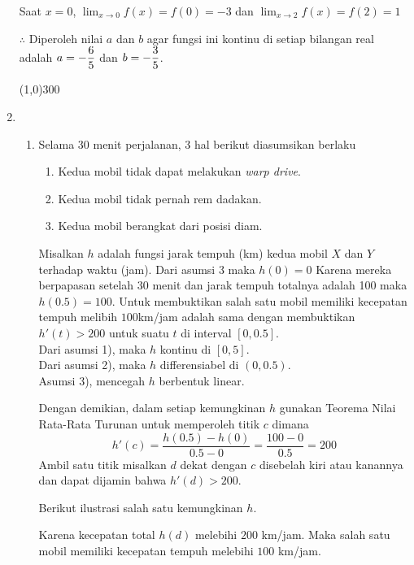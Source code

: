 \begin{enumerate}[leftmargin=*, label={\arabic*}.]
Saat $x=0$, $\lim_{x\to 0} f(x) = f(0)=-3$ dan $\lim_{x\to 2} f(x) = f(2)=1$

$\therefore$ Diperoleh nilai $a$ dan $b$ agar fungsi ini kontinu di setiap 
bilangan real adalah $\displaystyle a = -\frac{6}{5}$ dan $\displaystyle b=-\frac{3}{5}$.


\begin{center}\line(1,0){300}\end{center}


\item 
    \begin{enumerate}[label={\alph*}.]
    \item Selama 30 menit perjalanan, 3 hal berikut diasumsikan berlaku 
        \begin{enumerate}[label={\arabic*})]
        \item Kedua mobil tidak dapat melakukan \textit{warp drive}.
        \item Kedua mobil tidak pernah rem dadakan.
        \item Kedua mobil berangkat dari posisi diam.
        \end{enumerate}
    Misalkan $h$ adalah fungsi jarak tempuh (km) kedua mobil $X$
    dan $Y$ terhadap waktu (jam). Dari asumsi 3 maka $h(0)=0$ Karena mereka 
    berpapasan setelah 30 menit dan jarak tempuh totalnya adalah 100 maka 
    $h(0.5) = 100$. Untuk membuktikan salah satu mobil memiliki kecepatan 
    tempuh melibih $100$km/jam adalah sama dengan membuktikan $h'(t) > 200$ 
    untuk suatu $t$ di interval $[0,0.5]$.\\
    Dari asumsi 1), maka $h$ kontinu di $[0,5]$.\\
    Dari asumsi 2), maka $h$ differensiabel di $(0,0.5)$.\\
    Asumsi 3), mencegah $h$ berbentuk linear.

    Dengan demikian, dalam setiap kemungkinan $h$ gunakan Teorema Nilai 
    Rata-Rata Turunan untuk memperoleh titik $c$ dimana
    \[
    h'(c) = \frac{h(0.5)-h(0)}{0.5-0} = \frac{100-0}{0.5} = 200
    \]
    Ambil satu titik misalkan $d$ dekat dengan $c$ disebelah kiri atau kanannya 
    dan dapat dijamin bahwa $h'(d) > 200$.

    Berikut ilustrasi salah satu kemungkinan $h$.

    
    
    Karena kecepatan total $h(d)$ melebihi $200$ km/jam. Maka salah satu mobil memiliki kecepatan tempuh 
    melebihi $100$ km/jam.


\end{enumerate}
\end{enumerate}
